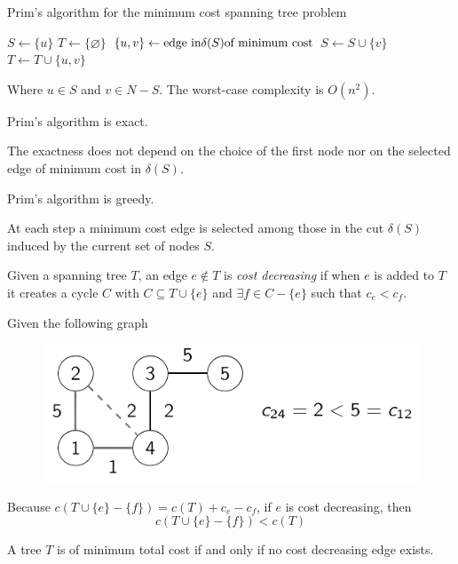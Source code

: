 \documentclass[12pt, a4paper]{report}
\begin{document}
    \begin{algorithm}[H]
        \caption{Prim's algorithm for the minimum cost spanning tree problem}
            \begin{algorithmic}[1]
                \State $S \leftarrow \{u\}$
                \State $T \leftarrow \{\varnothing\}$
                    \State $\{u,v\}\leftarrow \textnormal{edge in} \delta(S) \textnormal{of minimum cost}$
                    \State $S \leftarrow S \cup \{v\}$
                    \State $T \leftarrow T \cup \{u,v\}$
                \EndWhile
            \end{algorithmic}
    \end{algorithm}
    Where $u \in S$ and $v \in N-S$. The worst-case complexity is $O(n^2)$. 
    \begin{proposition}
        Prim's algorithm is exact. 
    \end{proposition}        
    The exactness does not depend on the choice of the first node nor on the selected edge of minimum cost in $\delta(S)$. 
    \begin{proposition}
        Prim's algorithm is greedy. 
    \end{proposition}     
    At each step a minimum cost edge is selected among those in the cut $\delta (S)$ induced by the current set of nodes $S$. 
    \begin{definition}
        Given a spanning tree $T$, an edge $e \notin T$ is \emph{cost decreasing} if when $e$ is added to $T$ it creates a cycle $C$ with $C \subseteq T \cup \{e\}$ and 
        $\exists f \in C-\{e\}$ such that $c_e<c_f$. 
    \end{definition}
    \begin{example}
        Given the following graph
        \begin{figure}[H]
            \centering
            \includegraphics[width=0.5\linewidth]{images/costdecreasing.png}
        \end{figure}
        Because $c(T \cup \{e\}-\{f\})=c(T)+c_e-c_f$, if $e$ is cost decreasing, then
        \[c(T \cup \{e\}-\{f\})<c(T)\]
    \end{example}
    \begin{theorem}
        A tree $T$ is of minimum total cost if and only if no cost decreasing edge exists. 
    \end{theorem}
\end{document}
